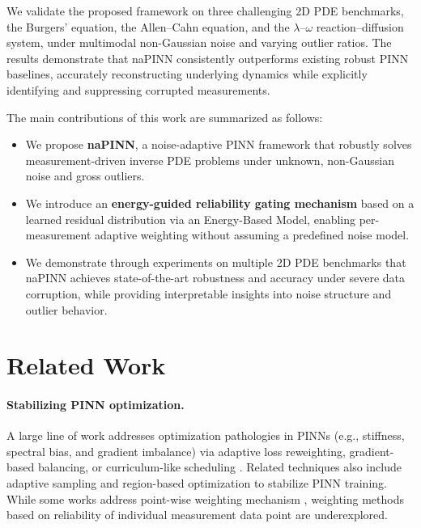 \documentclass{article}
\theoremstyle{plain}
\theoremstyle{definition}
\theoremstyle{remark}
\begin{document}
We validate the proposed framework on three challenging 2D PDE benchmarks, the Burgers' equation, the Allen–Cahn equation, and the $\lambda$–$\omega$ reaction–diffusion system, under multimodal non-Gaussian noise and varying outlier ratios. The results demonstrate that naPINN consistently outperforms existing robust PINN baselines, accurately reconstructing underlying dynamics while explicitly identifying and suppressing corrupted measurements.

The main contributions of this work are summarized as follows:
\begin{itemize}
    \item We propose \textbf{naPINN}, a noise-adaptive PINN framework that robustly solves measurement-driven inverse PDE problems under unknown, non-Gaussian noise and gross outliers.
    \item We introduce an \textbf{energy-guided reliability gating mechanism} based on a learned residual distribution via an Energy-Based Model, enabling per-measurement adaptive weighting without assuming a predefined noise model.
    \item We demonstrate through experiments on multiple 2D PDE benchmarks that naPINN achieves state-of-the-art robustness and accuracy under severe data corruption, while providing interpretable insights into noise structure and outlier behavior.
\end{itemize}

\section{Related Work}
\label{sec:relatedwork}

\paragraph{Stabilizing PINN optimization.}
A large line of work addresses optimization pathologies in PINNs (e.g., stiffness, spectral bias, and gradient imbalance) via adaptive loss reweighting, gradient-based balancing, or curriculum-like scheduling \cite{Rahaman2019, Wang2021, SWang2022, CWang2022, Chen2018, Xiang2022, Hwang2024, Bischof2025}.  
Related techniques also include adaptive sampling \cite{Nabian2021} and region-based optimization \cite{Wu2024, duan2025} to stabilize PINN training. While some works address point-wise weighting mechanism \cite{McClenny2023}, weighting methods based on reliability of individual measurement data point are underexplored.
\end{document}
